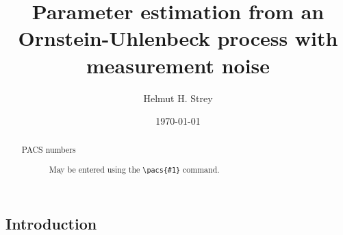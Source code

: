 \documentclass[%
 reprint,
 amsmath,amssymb,
 aps,
]{revtex4-1}
\begin{document}

\title{Parameter estimation from an Ornstein-Uhlenbeck process with measurement noise}

\author{Helmut H. Strey}

\date{\today}%

\begin{abstract}
\begin{description}
\item[PACS numbers]
May be entered using the \verb+\pacs{#1}+ command.
\end{description}
\end{abstract}

\maketitle

\onecolumngrid
\subsection{Introduction}
\end{document}
